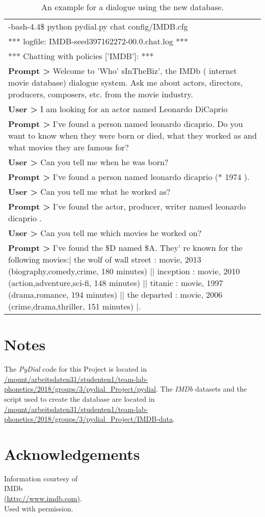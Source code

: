 \documentclass[11pt,a4paper]{article}
\begin{document}
\begin{table*}[h]
		\begin{tabular}{p{\linewidth}}
			\toprule[0.5mm]
			-bash-4.4\$ python pydial.py chat config/IMDB.cfg \\[0.7mm]
			*** logfile: IMDB-seed397162272-00.0.chat.log *** \\[0.7mm]
			*** Chatting with policies ['IMDB']: *** \\[0.7mm]
			\textbf{Prompt >} Welcome to 'Who' sInTheBiz', the IMDb ( internet movie database) dialogue system. Ask me about actors, directors, producers, composers, etc. from the movie industry. \\[0.7mm]
			\textbf{User >} I am looking for an actor named Leonardo DiCaprio \\[0.7mm]
			\textbf{Prompt >} I've found a person named leonardo dicaprio. Do you want to know when they were born or died, what they worked as and what movies they are famous for? \\[0.7mm]
			\textbf{User >} Can you tell me when he was born? \\[0.7mm]
			\textbf{Prompt >} I've found a person named leonardo dicaprio (* 1974 ). \\[0.7mm]
			\textbf{User >} Can you tell me what he worked as? \\[0.7mm]
			\textbf{Prompt >} I've found the actor, producer, writer named leonardo dicaprio . \\[0.7mm]
			\textbf{User >} Can you tell me which movies he worked on? \\[0.7mm]
			\textbf{Prompt >} I've found the \$D named \$A. They' re known for the following movies:| the wolf of wall street : movie, 2013 (biography,comedy,crime, 180 minutes) || inception : movie, 2010 (action,adventure,sci-fi, 148 minutes) || titanic : movie, 1997 (drama,romance, 194 minutes) || the departed : movie, 2006 (crime,drama,thriller, 151 minutes) |. \\[0.7mm]
			
			\bottomrule[0.5mm]
		\end{tabular}
		\caption{An example for a dialogue using the new database.}
		\label{tab:DialogueExample}
	\end{table*}

\section*{Notes}
The \textit{PyDial} code for this Project is located in \url{/mount/arbeitsdaten31/studenten1/team-lab-phonetics/2018/groups/3/pydial_Project/pydial}. The \textit{IMDb} datasets and the script used to create the database are located in \url{/mount/arbeitsdaten31/studenten1/team-lab-phonetics/2018/groups/3/pydial_Project/IMDB-data}.

\section*{Acknowledgements}
Information courtesy of\\
IMDb\\
\url{(http://www.imdb.com)}.\\
Used with permission.


\clearpage



\end{document}

